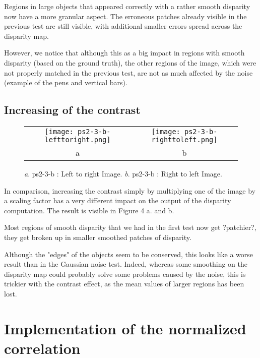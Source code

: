 \documentclass[a4paper,11pt]{article}
\begin{document}
Regions in large objects that appeared correctly with a rather smooth disparity now have a more granular aspect. The erroneous patches already visible in the previous test are still visible, with additional smaller errors spread across the disparity map.

However, we notice that although this as a big impact in regions with smooth disparity (based on the ground truth), the other regions of the image, which were not properly matched in the previous test, are not as much affected by the noise (example of the pens and vertical bars).


\subsection{Increasing of the contrast}



 \begin{figure}[H]
\begin{center}
\begin{tabular}{cc}
	\texttt{[image: ps2-3-b-lefttoright.png]}&
	\texttt{[image: ps2-3-b-righttoleft.png]}\\
	a&b
\end{tabular}
\end{center}
\caption{ 
\textit{a}. ps2-3-b : Left to right Image.  \textit{b}. ps2-3-b : Right to left Image. }
\label{ps2-1}
\end{figure}


In comparison, increasing the contrast simply by multiplying one of the image by a scaling factor has a very different impact on the output of the disparity computation. The result is visible in Figure 4 a. and b. 

Most regions of smooth disparity that we had in the first test now get ?patchier?, they get broken up in smaller smoothed patches of disparity.

Although the "edges" of the objects seem to be conserved, this looks like a worse result than in the Gaussian noise test.
Indeed, whereas some smoothing on the disparity map could probably solve some problems caused by the noise, this is trickier with the contrast effect, as the mean values of larger regions has been lost.

\section{Implementation of the normalized correlation}
\end{document}
